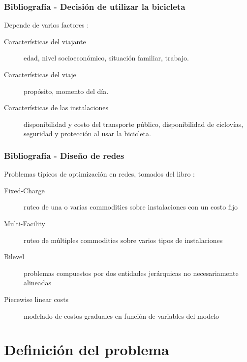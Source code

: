 \documentclass[aspectratio=43, 10pt]{beamer}
\begin{document}

\begin{frame}
    \frametitle{Bibliografía - Decisión de utilizar la bicicleta}

    Depende de varios factores \parencite{ortuz2011}:

    \begin{description}
        \item[Características del viajante] edad, nivel socioeconómico, situación familiar, trabajo.
        \item[Características del viaje] propósito, momento del día.
        \item[Características de las instalaciones] disponibilidad y costo del transporte público, disponibilidad de ciclovías, seguridad y protección al usar la bicicleta.
    \end{description}
\end{frame}

\begin{frame}
    \frametitle{Bibliografía - Diseño de redes}

    Problemas típicos de optimización en redes, tomados del libro \textcite{crainic2021}:

    \begin{description}
        \item[Fixed-Charge] ruteo de una o varias commodities sobre instalaciones con un costo fijo
        \item[Multi-Facility] ruteo de múltiples commodities sobre varios tipos de instalaciones
        \item[Bilevel] problemas compuestos por dos entidades jerárquicas no necesariamente alineadas
        \item[Piecewise linear costs] modelado de costos graduales en función de variables del modelo
    \end{description}
\end{frame}

\section{Definición del problema}
\end{document}
